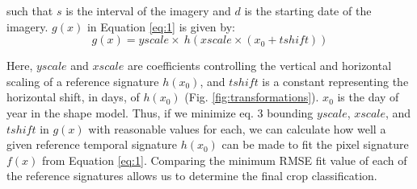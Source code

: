 such that $s$ is the interval of the imagery and $d$ is the starting date of the imagery. $g(x)$ in Equation \ref{eq:1} is given by:
\begin{equation}
\label{eq:gofx}
  g(x) = yscale\times~h\left(xscale\times(x_0 + tshift)\right)
\end{equation}

Here, $yscale$ and  $xscale$ are coefficients controlling the vertical and horizontal scaling of a reference signature $h(x_0)$, and $tshift$ is a constant representing the horizontal shift, in days, of $h(x_0)$ (Fig. \ref{fig:transformations}). $x_0$ is the day of year in the shape model. Thus, if we minimize eq. 3 bounding $yscale$, $xscale$, and $tshift$  in $g(x)$ with reasonable values for each, we can calculate how well a given reference temporal signature $h(x_0)$ can be made to fit the pixel signature $f(x)$ from Equation \ref{eq:1}. Comparing the minimum RMSE fit value of each of the reference signatures allows us to determine the final crop classification.
